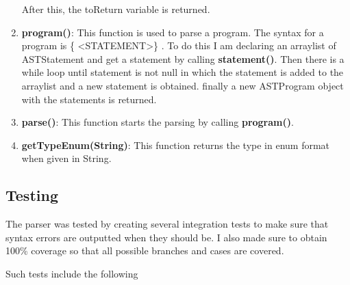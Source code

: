 \documentclass{article}
\begin{document}
\begin{enumerate}
				After this, the toReturn variable is returned.
				
				\item \textbf{program()}: This function is used to parse a program. The syntax for a program is  \{ \textless STATEMENT\textgreater \} . To do this I am declaring an arraylist of ASTStatement and get a statement by calling \textbf{statement()}. Then there is a while loop until statement is not null in which the statement is added to the arraylist and a new statement is obtained. finally a new ASTProgram object with the statements is returned.
				
				\item \textbf{parse()}: This function starts the parsing by calling \textbf{program()}.
				
				\item \textbf{getTypeEnum(String)}: This function returns the type in enum format when given in String.
				
				
					
								
				\end{enumerate}
				
				\subsection{Testing}
				
				The parser was tested by creating several integration tests to make sure that syntax errors are outputted when they should be. I also made sure to obtain 100\% coverage so that all possible branches and cases are covered.
				
				Such tests include the following
				
\end{document}
